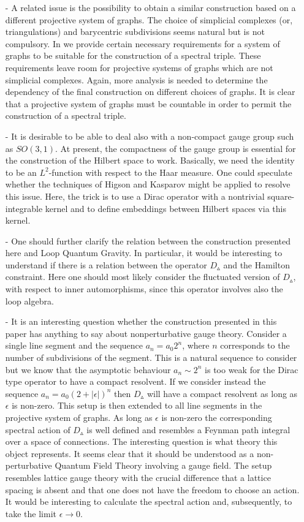 \documentclass[12pt]{article}
\def\e{\epsilon}
\begin{document}
\begin{itemize}
\item[-]
A related issue is the possibility to obtain a similar construction based on a different projective system of graphs. The choice of simplicial complexes (or, triangulations) and barycentric subdivisions seems natural but is not compulsory. In \cite{Aastrup} we provide certain necessary requirements for a system of graphs to be suitable for the construction of a spectral triple. These requirements leave room for projective systems of graphs which are not simplicial complexes. Again, more analysis is needed to determine the dependency of the final construction on different choices of graphs. It is clear that a projective system of graphs must be countable in order to permit the construction of a spectral triple. 
\item[-]
It is desirable to be able to deal also with a non-compact gauge group such as $SO(3,1)$. At present, the compactness of the gauge group is essential for the construction of the Hilbert space to work. Basically, we need the identity to be an $L^2$-function with respect to the Haar measure. One could speculate whether the techniques of Higson and Kasparov \cite{Higson} might be applied to resolve this issue. Here, the trick is to use a Dirac operator with a nontrivial square-integrable kernel and to define embeddings between Hilbert spaces via this kernel.
\item[-]
One should further clarify the relation between the construction presented here and Loop Quantum Gravity. In particular, it would be interesting to understand if there is a relation between the operator $D_{\smalltriangleup}$ and the Hamilton constraint. Here one should most likely consider the fluctuated version of $D_{\smalltriangleup}$, with respect to inner automorphisms, since this operator involves also the loop algebra. 
\item[-]
It is an interesting question whether the construction presented in this paper has anything to say about nonperturbative gauge theory. Consider a single line segment and the sequence $a_n=a_0 2^n$, where $n$ corresponds to the number of subdivisions of the segment. This is a natural sequence to consider but we know that the asymptotic behaviour $a_n\sim 2^n$ is too weak for the Dirac type operator to have a compact resolvent. If we consider instead the sequence $a_n=a_0 (2+|\e|)^n$ then $D_{\smalltriangleup}$ will have a compact resolvent as long as $\e$ is non-zero. This setup is then extended to all line segments in the projective system of graphs. As long as $\e$ is non-zero the corresponding spectral action of $D_{\smalltriangleup}$ is well defined and resembles a Feynman path integral over a space of connections. The interesting question is what theory this object represents. It seems clear that it should be understood as a non-perturbative Quantum Field Theory involving a gauge field. The setup resembles lattice gauge theory with the crucial difference that a lattice spacing is absent and that one does not have the freedom to choose an action. It would be interesting to calculate the spectral action and, subsequently, to take the limit $\e\rightarrow 0$. 

\end{itemize}
\end{document}
